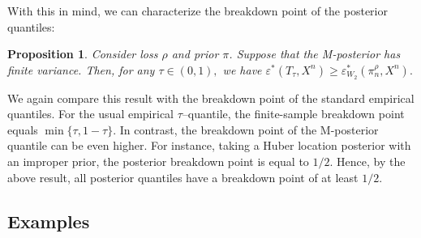 \documentclass[11pt, oneside]{amsart}
\newtheorem{proposition}{Proposition}
\theoremstyle{definition}   %
\newcommand{\loss}{\rho}
\begin{document}
With this in mind, we can characterize the breakdown point of the posterior quantiles:
%
\begin{proposition}
\label{prop::bp-posterior-quantiles}
    Consider loss \( \loss \) and prior \( \pi \). Suppose that the M-posterior has finite variance. Then, for any \( \tau \in (0,1),\) we have
    \( \varepsilon^*(T_\tau, X^n) \geq \varepsilon^*_{W_2}(\pi^\rho_n, X^n). \)
\end{proposition}

We again compare this result with the breakdown point of the standard empirical quantiles. For the usual empirical $\tau$--quantile, the finite-sample breakdown point equals $\min\{\tau,1-\tau\}$. In contrast, the breakdown point of the M-posterior quantile can be even higher. For instance, taking a Huber location posterior with an improper prior, the posterior breakdown point is equal to \( 1/2\). Hence, by the above result, all posterior quantiles have a breakdown point of at least \( 1/2\).

%
%
\subsection{Examples}
\end{document}
